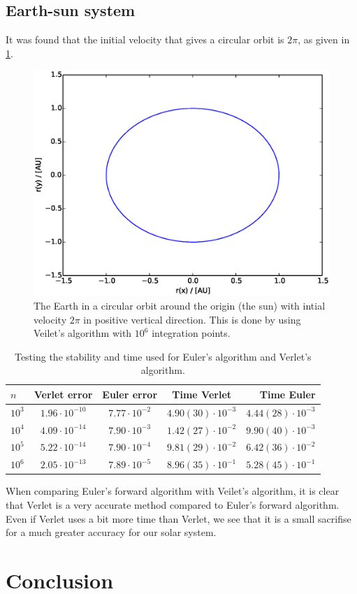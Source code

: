 \documentclass{article}
\begin{document}
\subsection{Earth-sun system}
It was found that the initial velocity that gives a circular orbit is $2\pi$, as given in \ref{jordensbane}.
\begin{figure}[H]
  \includegraphics[scale=0.6]{3c_jordensbane_verlet_n10e6.eps}
  \caption{The Earth in a circular orbit around the origin (the sun) with intial velocity $2\pi$ in positive vertical direction. This is done by using Veilet's algorithm with $10^6$ integration points.}
  \label{jordensbane}
\end{figure}

\begin{table}[H]
    \centering
    \begin{tabular}{|l|c|c|c|r|}
    \hline
     $n$ & Verlet error  & Euler error & Time Verlet & Time Euler\\
     \hline
      $10^3$  & $1.96\cdot10^{-10}$  & $7.77\cdot10^{-2}$ & $ 4.90 (30) \cdot 10^{-3}$ & $ 4.44 (28) \cdot 10^{-3}$\\
      $10^4$  & $4.09\cdot10^{-14}$  & $7.90\cdot10^{-3}$ & $ 1.42 (27) \cdot 10^{-2}$ & $ 9.90 (40) \cdot 10^{-3}$\\
      $10^5$  & $5.22\cdot10^{-14}$  & $7.90\cdot10^{-4}$ & $ 9.81 (29) \cdot 10^{-2}$ & $ 6.42 (36) \cdot 10^{-2}$\\
      $10^6$  & $2.05\cdot10^{-13}$  & $7.89\cdot10^{-5}$ & $ 8.96 (35) \cdot 10^{-1}$ & $ 5.28 (45) \cdot 10^{-1}$\\
      \hline
    \end{tabular}
    \caption{Testing the stability and time used for Euler's algorithm and Verlet's algorithm.}
    \label{stability}
\end{table}

When comparing Euler's forward algorithm with Veilet's algorithm, it is clear that Verlet is a very accurate method compared to Euler's forward algorithm. Even if Verlet uses a bit more time than Verlet, we see that it is a small sacrifise for a much greater accuracy for our solar system.   
\section{Conclusion}
\end{document}
